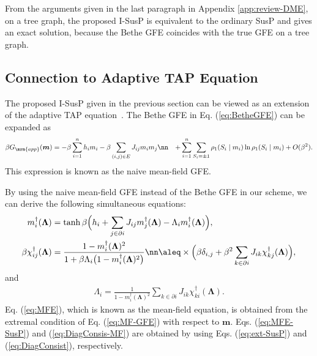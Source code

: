 \documentclass[%
 reprint,
 amsmath,amssymb,
 aps, 
 pre,
 showkeys
]{revtex4-1}
\begin{document}
From the arguments given in the last paragraph in Appendix \ref{app:review-DME}, on a tree graph, 
the proposed I-SusP is equivalent to the ordinary SusP and gives an exact solution, 
because the Bethe GFE coincides with the true GFE on a tree graph.  

\subsection{Connection to Adaptive TAP Equation}

The proposed I-SusP given in the previous section can be viewed as an extension of the adaptive TAP equation~\cite{Opper&Winther2001a, Opper&Winther2001b}. 
The Bethe GFE in Eq. (\ref{eq:BetheGFE}) can be expanded as~\cite{Horiguchi1981}
\begin{align}
\beta G_{\mrm{app}}(\bm{m})&=-  \beta \sum_{i=1}^n h_i m_i - \beta \sum_{(i,j) \in E}J_{ij} m_im_j \nn
&+ \sum_{i=1}^n  \sum_{S_i = \pm 1}\rho_1(S_i\mid m_i)\ln \rho_1(S_i\mid m_i) + O(\beta^2).
\label{eq:MF-GFE}
\end{align}
This expression is known as the naive mean-field GFE.

By using the naive mean-field GFE instead of the Bethe GFE in our scheme, we can derive the following simultaneous equations:
\begin{align}
m_i^{\dagger}(\bm{\Lambda})&=\tanh \beta \Big( h_i + \sum_{j \in \partial i}J_{ij}m_j^{\dagger}(\bm{\Lambda}) - \Lambda_i m_i^{\dagger}(\bm{\Lambda}) \Big), 
\label{eq:MFE}\\
\beta \chi_{ij}^{\dagger}(\bm{\Lambda})&=\frac{1 - m_i^{\dagger}(\bm{\Lambda})^2}{1 + \beta \Lambda_i \big(1 - m_i^{\dagger}(\bm{\Lambda})^2\big)}\nn
\aleq\times \Big(\beta \delta_{i,j} + \beta^2 \sum_{k \in \partial i}J_{ik} \chi_{kj}^{\dagger}(\bm{\Lambda}) \Big),
\label{eq:MFE-SusP}
\end{align}
and 
\begin{align}
\Lambda_i = \frac{1}{1-m_i^{\dagger}(\bm{\Lambda})^2} \sum_{k \in \partial i}J_{ik} \chi_{ki}^{\dagger}(\bm{\Lambda}).
\label{eq:DiagConsis-MF}
\end{align}
Eq. (\ref{eq:MFE}), which is known as the mean-field equation, is obtained from the extremal condition of Eq. (\ref{eq:MF-GFE}) with respect to $\bm{m}$. 
Eqs. (\ref{eq:MFE-SusP}) and (\ref{eq:DiagConsis-MF}) are obtained by using Eqs. (\ref{eq:ext-SusP}) and (\ref{eq:DiagConsist}), respectively.
\end{document}
